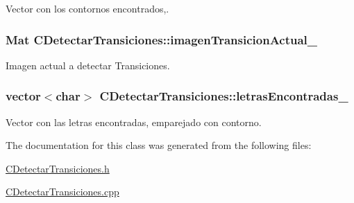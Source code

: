 Vector con los contornos encontrados,. 

\subsubsection[{\texorpdfstring{imagen\+Transicion\+Actual\+\_\+}{imagenTransicionActual_}}]{\setlength{\rightskip}{0pt plus 5cm}Mat C\+Detectar\+Transiciones\+::imagen\+Transicion\+Actual\+\_\+\hspace{0.3cm}{\ttfamily [private]}}\hypertarget{classCDetectarTransiciones_aa58ae70139c85dc3838338eb53a520d3}{}\label{classCDetectarTransiciones_aa58ae70139c85dc3838338eb53a520d3}


Imagen actual a detectar Transiciones. 

\subsubsection[{\texorpdfstring{letras\+Encontradas\+\_\+}{letrasEncontradas_}}]{\setlength{\rightskip}{0pt plus 5cm}vector$<$char$>$ C\+Detectar\+Transiciones\+::letras\+Encontradas\+\_\+\hspace{0.3cm}{\ttfamily [private]}}\hypertarget{classCDetectarTransiciones_a0bc5a3fc42f833f3e649e8b8c2fe573d}{}\label{classCDetectarTransiciones_a0bc5a3fc42f833f3e649e8b8c2fe573d}


Vector con las letras encontradas, emparejado con contorno. 



The documentation for this class was generated from the following files\+:\begin{DoxyCompactItemize}
\item 
\hyperlink{CDetectarTransiciones_8h}{C\+Detectar\+Transiciones.\+h}\item 
\hyperlink{CDetectarTransiciones_8cpp}{C\+Detectar\+Transiciones.\+cpp}\end{DoxyCompactItemize}
